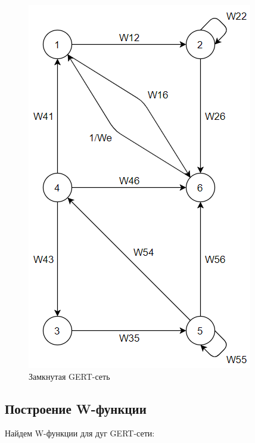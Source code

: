 \begin{figure}[h!]
	\centering
	\includegraphics[scale = 0.55]{images/p4_1.png}
	\caption{Замкнутая GERT-сеть}
	\label{image:p4_1}
\end{figure}

\subsection{Построение W-функции}

Найдем W-функции для дуг GERT-сети:

